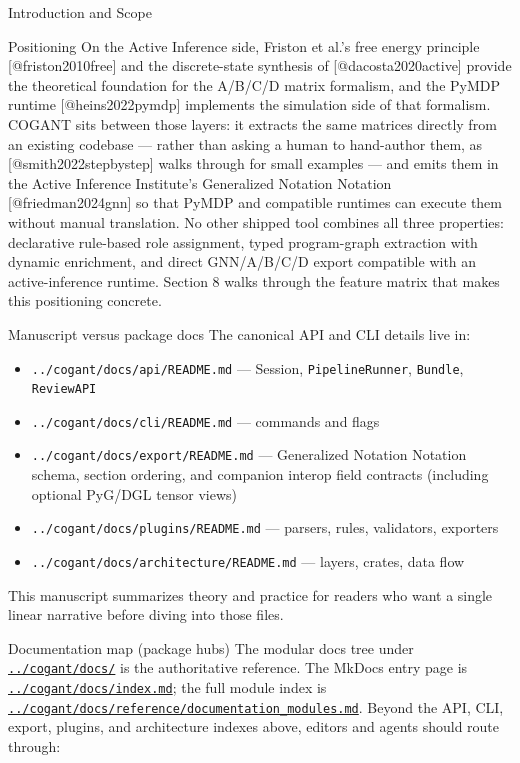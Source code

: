 \documentclass[
  ignorenonframetext,
]{beamer}
\providecommand{\tightlist}{%
  \setlength{\itemsep}{0pt}\setlength{\parskip}{0pt}}
\begin{document}
\begin{frame}[fragile]{Introduction and Scope}
\begin{block}{Positioning}
On the Active Inference side, Friston et al.'s free energy principle
{[}@friston2010free{]} and the discrete-state synthesis of
{[}@dacosta2020active{]} provide the theoretical foundation for the
A/B/C/D matrix formalism, and the PyMDP runtime {[}@heins2022pymdp{]}
implements the simulation side of that formalism. COGANT sits between
those layers: it extracts the same matrices directly from an existing
codebase --- rather than asking a human to hand-author them, as
{[}@smith2022stepbystep{]} walks through for small examples --- and
emits them in the Active Inference Institute's Generalized Notation
Notation {[}@friedman2024gnn{]} so that PyMDP and compatible runtimes
can execute them without manual translation. No other shipped tool
combines all three properties: declarative rule-based role assignment,
typed program-graph extraction with dynamic enrichment, and direct
GNN/A/B/C/D export compatible with an active-inference runtime. Section
8 walks through the feature matrix that makes this positioning concrete.
\end{block}

\begin{block}{Manuscript versus package docs}
\protect{}\label{manuscript-versus-package-docs}
The canonical API and CLI details live in:

\begin{itemize}
\tightlist
\item
  \texttt{../cogant/docs/api/README.md} --- Session,
  \texttt{PipelineRunner}, \texttt{Bundle}, \texttt{ReviewAPI}
\item
  \texttt{../cogant/docs/cli/README.md} --- commands and flags
\item
  \texttt{../cogant/docs/export/README.md} --- Generalized Notation
  Notation schema, section ordering, and companion interop field
  contracts (including optional PyG/DGL tensor views)
\item
  \texttt{../cogant/docs/plugins/README.md} --- parsers, rules,
  validators, exporters
\item
  \texttt{../cogant/docs/architecture/README.md} --- layers, crates,
  data flow
\end{itemize}

This manuscript summarizes theory and practice for readers who want a
single linear narrative before diving into those files.
\end{block}

\begin{block}{Documentation map (package hubs)}
\protect{}\label{documentation-map-package-hubs}
The modular docs tree under
\href{../cogant/docs/}{\texttt{../cogant/docs/}} is the authoritative
reference. The MkDocs entry page is
\href{../cogant/docs/index.md}{\texttt{../cogant/docs/index.md}}; the
full module index is
\href{../cogant/docs/reference/documentation_modules.md}{\texttt{../cogant/docs/reference/documentation\_modules.md}}.
Beyond the API, CLI, export, plugins, and architecture indexes above,
editors and agents should route through:


\end{block}
\end{frame}
\end{document}
